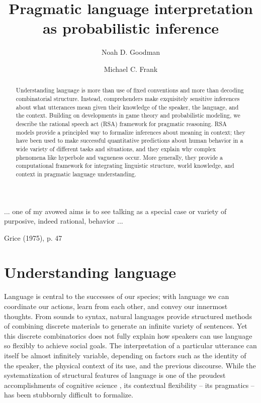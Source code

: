 \documentclass[]{elsarticle}
\title{Pragmatic language interpretation as probabilistic inference}
\author[stan]{Noah D. Goodman\corref{cor1}}
\author[stan]{Michael C. Frank}
\begin{document}
\begin{abstract}
Understanding language is more than use of fixed conventions and more than decoding combinatorial structure. Instead, comprehenders make exquisitely sensitive inferences about what utterances mean given their knowledge of the speaker, the language, and the context.
Building on developments in game theory and probabilistic modeling, we describe the rational speech act (RSA) framework for pragmatic reasoning. RSA models provide a principled way to formalize inferences about meaning in context; they have been used to make successful quantitative predictions about human behavior in a wide variety of different tasks and situations, and they explain why complex phenomena like hyperbole and vagueness occur. More generally, they provide a computational framework for integrating linguistic structure, world knowledge, and context in pragmatic language understanding.
\end{abstract}

\maketitle

\epigraph{... one of my avowed aims is to see talking as a special case or
variety of purposive, indeed rational, behavior ...}{Grice (1975),
p. 47}

\section{Understanding language}
\label{introduction}

Language is central to the successes of our species; with language we
can coordinate our actions, learn from each other, and convey our
innermost thoughts. From sounds to syntax, natural languages provide
structured methods of combining discrete materials to generate an
infinite variety of sentences. Yet this discrete combinatorics does not
fully explain how speakers can use language so flexibly to achieve
social goals. The interpretation of a particular utterance
can itself be almost infinitely variable, depending on factors such as
the identity of the speaker, the physical context of its use, and the
previous discourse. While the systematization of structural features of
language is one of the proudest accomplishments of cognitive science \citep[e.g.,][]{chomsky1965,jackendoff2002,goldberg2003}, its contextual
flexibility -- its pragmatics -- has been stubbornly difficult to
formalize.
\end{document}
